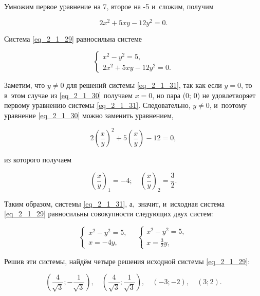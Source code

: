 Умножим первое уравнение на 7, второе на -5 и~сложим, получим

\begin{equation}\label{eq_2_1_30}
2x^{2} + 5xy - 12y^{2} = 0.
\end{equation}

Система \eqref{eq_2_1_29} равносильна системе

\begin{equation}\label{eq_2_1_31}
\begin{cases}
x^{2} - y^{2} = 5, \\
2x^{2} + 5xy - 12y^{2} = 0.
\end{cases}
\end{equation}

Заметим, что $y \ne 0$ для решений системы \eqref{eq_2_1_31},
так как если $y = 0$, то в~этом случае из \eqref{eq_2_1_30} получаем $x = 0$,
но пара (0; 0) не удовлетворяет первому уравнению системы \eqref{eq_2_1_31}.
Следовательно, $y \ne 0$, и~поэтому уравнение \eqref{eq_2_1_30} можно заменить уравнением,

\begin{equation}\label{eq_2_1_32}
\displaystyle
2\left(\frac{x}{y}\right)^{2} +
5\left(\frac{x}{y}\right) -
12
= 0,
\end{equation}

\noindent
из которого получаем

\begin{equation}\label{eq_2_1_33}
\displaystyle \left(\frac{x}{y}\right)_{1} = -4;
\quad
\left(\frac{x}{y}\right)_{2} = \frac{3}{2}.
\end{equation}

Таким образом, системы \eqref{eq_2_1_31}, а,~значит, и~исходная система \eqref{eq_2_1_29}
равносильны совокупности следующих двух систем:

\begin{equation*}
\begin{cases}
x^{2} - y^{2} = 5, \\
x = -4y,
\end{cases}
\quad
\begin{cases}
x^{2} - y^{2} = 5, \\
\displaystyle x = \frac{3}{2}y,
\end{cases}
\end{equation*}

Решив эти системы, найдём четыре решения исходной системы \eqref{eq_2_1_29}:

\begin{equation*}
\displaystyle
\left(
\frac{4}{\sqrt{3}}; -\frac{1}{\sqrt{3}}
\right), \quad
\left(
\frac{4}{\sqrt{3}}; \frac{1}{\sqrt{3}}
\right), \quad
(-3; -2), \quad
(3; 2).
\end{equation*}

